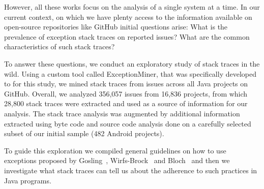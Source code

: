 \documentclass[conference]{IEEEtran}
\begin{document}
However, all these works focus on the analysis of a single system at a time. In
our current context, on which we have plenty access to the information available
on open-source repositories like GitHub initial questions arise: What is the
prevalence of exception stack traces on reported issues? What are the common
characteristics of such stack traces?



To answer these questions, we conduct an exploratory study of stack traces in
the wild. Using a custom tool called ExceptionMiner, that was specifically
developed to for this study, we mined stack traces from issues across all Java
projects on GitHub. Overall, we analyzed 356,057 issues from 16,836 projects,
from which 28,800 stack traces were extracted and used as a source of
information for our analysis. The stack trace analysis  was augmented by
additional information extracted using byte code and source code analysis done
on a carefully selected subset of our initial sample (482 Android projects).

To guide this exploration we compiled general guidelines on how to use
exceptions proposed by Gosling~\cite{gosling2000java},
Wirfs-Brock~\cite{wirfs2006toward} and Bloch~\cite{bloch2008effective} and then
we investigate what stack traces can tell us about the adherence to such
practices in Java programs.


\end{document}
